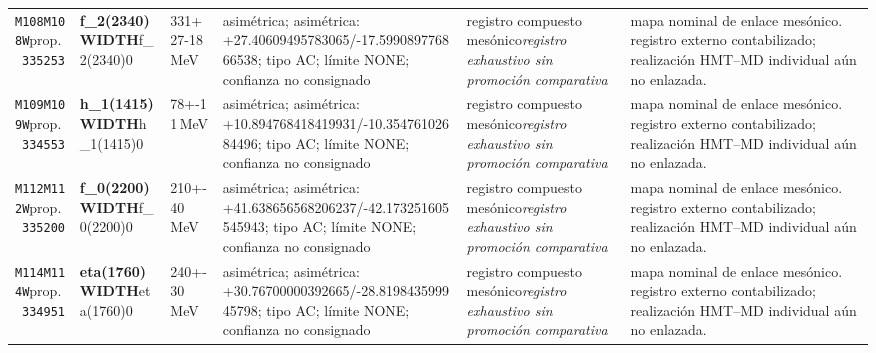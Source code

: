 \begin{landscape}
\begin{longtable}{L{1.85cm}L{4.45cm}L{2.35cm}L{4.05cm}L{3.35cm}L{7.15cm}}
\texttt{M108}\newline \texttt{M108W}\newline prop.\ \texttt{335253} & \textbf{f\_\allowbreak{}2(2340) WIDTH}\newline f\_\allowbreak{}2(2340)0 & 331+27-18\,MeV & asimétrica; asimétrica: +27.40609495783065/-17.599089776866538; tipo AC; límite NONE; confianza no consignado & registro compuesto mesónico\newline \emph{registro exhaustivo sin promoción comparativa} & mapa nominal de enlace mesónico. registro externo contabilizado; realización HMT--MD individual aún no enlazada. \\
\texttt{M109}\newline \texttt{M109W}\newline prop.\ \texttt{334553} & \textbf{h\_\allowbreak{}1(1415) WIDTH}\newline h\_\allowbreak{}1(1415)0 & 78+-11\,MeV & asimétrica; asimétrica: +10.894768418419931/-10.35476102684496; tipo AC; límite NONE; confianza no consignado & registro compuesto mesónico\newline \emph{registro exhaustivo sin promoción comparativa} & mapa nominal de enlace mesónico. registro externo contabilizado; realización HMT--MD individual aún no enlazada. \\
\texttt{M112}\newline \texttt{M112W}\newline prop.\ \texttt{335200} & \textbf{f\_\allowbreak{}0(2200) WIDTH}\newline f\_\allowbreak{}0(2200)0 & 210+-40\,MeV & asimétrica; asimétrica: +41.638656568206237/-42.173251605545943; tipo AC; límite NONE; confianza no consignado & registro compuesto mesónico\newline \emph{registro exhaustivo sin promoción comparativa} & mapa nominal de enlace mesónico. registro externo contabilizado; realización HMT--MD individual aún no enlazada. \\
\texttt{M114}\newline \texttt{M114W}\newline prop.\ \texttt{334951} & \textbf{eta(1760) WIDTH}\newline eta(1760)0 & 240+-30\,MeV & asimétrica; asimétrica: +30.76700000392665/-28.819843599945798; tipo AC; límite NONE; confianza no consignado & registro compuesto mesónico\newline \emph{registro exhaustivo sin promoción comparativa} & mapa nominal de enlace mesónico. registro externo contabilizado; realización HMT--MD individual aún no enlazada. \\

\end{longtable}
\end{landscape}
